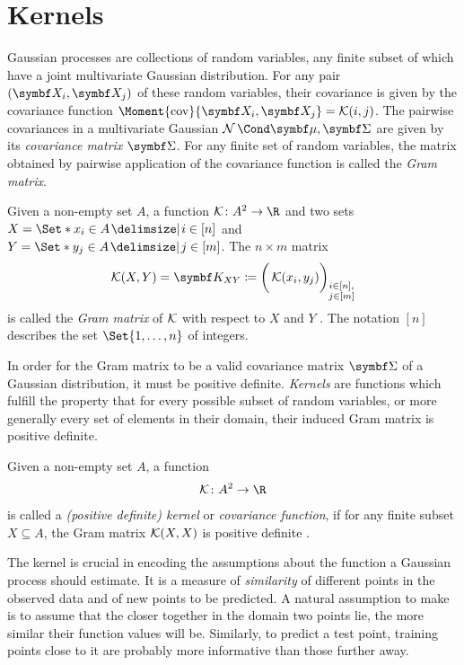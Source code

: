 \section{Kernels}
Gaussian processes are collections of random variables, any finite subset of which have a joint multivariate Gaussian distribution.
For any pair $(\rv{X_i}, \mat{X_j})$ of these random variables, their covariance is given by the covariance function $\Moment{\cov}{\rv{X_i}, \rv{X_j}} = \K(i, j)$.
The pairwise covariances in a multivariate Gaussian $\Gaussian{\mat{\mu}, \mat{\Sigma}}$ are given by its \emph{covariance matrix} $\mat{\Sigma}$.
For any finite set of random variables, the matrix obtained by pairwise application of the covariance function is called the \emph{Gram matrix}.
\begin{definition}
    Given a non-empty set $A$, a function $\K \colon A^2 \to \R$ and two sets $X = \Set*{x_i \in A \with i \in [n]}$ and $Y = \Set*{y_j \in A \with j \in [m]}$.
    The $n \times m$ matrix
    \begin{align}
        \K(X, Y) = \mat{K_{XY}} \coloneqq \bigg( \K(x_i, y_j) \bigg)_{\substack{i \in [n], \\ j \in [m]}}
    \end{align}
    is called the \emph{Gram matrix} of $\operatorname{\mathcal{K}}$ with respect to $X$ and $Y$ \cite{scholkopf_learning_2002}.
    The notation $[n]$ describes the set $\Set{1, \dots, n}$ of integers.
\end{definition}
In order for the Gram matrix to be a valid covariance matrix $\mat{\Sigma}$ of a Gaussian distribution, it must be positive definite.
\emph{Kernels} are functions which fulfill the property that for every possible subset of random variables, or more generally every set of elements in their domain, their induced Gram matrix is positive definite.
\begin{definition}[Kernel]
    Given a non-empty set $A$, a function
    \begin{align}
        \K \colon A^2 \to \R
    \end{align}
    is called a \emph{(positive definite) kernel} or \emph{covariance function}, if for any finite subset $X \subseteq A$, the Gram matrix $\operatorname{\mathcal{K}}(X, X)$ is positive definite \cite{scholkopf_learning_2002}.
\end{definition}
The kernel is crucial in encoding the assumptions about the function a Gaussian process should estimate.
It is a measure of \emph{similarity} of different points in the observed data and of new points to be predicted.
A natural assumption to make is to assume that the closer together in the domain two points lie, the more similar their function values will be.
Similarly, to predict a test point, training points close to it are probably more informative than those further away.

